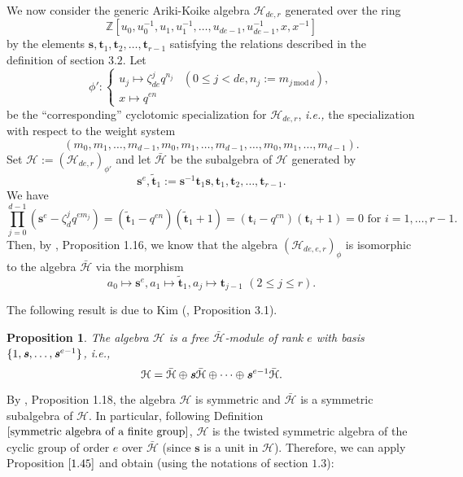 \documentclass[10pt,a4paper,titlepage]{article}
\newtheorem{proposition}[theorem]{Proposition}
\newcommand{\ie}{\emph{i.e., }}
\begin{document}
We now consider the generic Ariki-Koike algebra $\mathcal{H}_{de,r}$ generated over the ring
$$\mathbb{Z}[u_0,u_0^{-1},u_1,u_1^{-1},\ldots,u_{de-1},u_{de-1}^{-1},x,x^{-1}]$$
by the elements $\mathrm{\textbf{s}},\mathrm{\textbf{t}}_1,\mathrm{\textbf{t}}_2,\ldots,\mathrm{\textbf{t}}_{r-1}$ satisfying the relations described in the definition of section $3.2$. Let 
$$\phi' : \left\{ 
\begin{array}{ll} 
u_j \mapsto \zeta_{de}^{j} q^{n_j} &(0 \leq j <de, n_j := m_{j \,\mathrm{mod}\,d}), \\ 
x \mapsto q^{en}
\end{array} \right. 
$$
be the ``corresponding'' cyclotomic specialization for  $\mathcal{H}_{de,r}$, \ie the specialization with respect to the weight system $$(m_0,m_1,\ldots,m_{d-1},m_0,m_1,\ldots,m_{d-1},\ldots,m_0,m_1,\ldots,m_{d-1}).$$
Set $\mathcal{H}:=(\mathcal{H}_{de,r})_{\phi'}$ and let $\bar{\mathcal{H}}$ be the subalgebra of $\mathcal{H}$ generated by
$$\textbf{s}^e, \tilde{\textbf{t}}_1:=\textbf{s}^{-1}\textbf{t}_1\textbf{s}, 
\textbf{t}_1, \textbf{t}_2, \ldots, \textbf{t}_{r-1}.$$
We have
$$\prod_{j=0}^{d-1}(\textbf{s}^e-\zeta_d^jq^{em_j})=(\tilde{\textbf{t}}_1-q^{en})(\tilde{\textbf{t}}_1+1)=
(\textbf{t}_i-q^{en})(\textbf{t}_i+1)=0 \textrm{ for } i=1,\ldots, r-1.$$
Then, by \cite{Ariki}, Proposition 1.16, we know that the algebra $(\mathcal{H}_{de,e,r})_\phi$ is isomorphic to the algebra $\bar{\mathcal{H}}$ via the morphism
$$a_0 \mapsto  \textbf{s}^e, a_1 \mapsto \tilde{\textbf{t}}_1, a_j \mapsto \textbf{t}_{j-1}\,\, (2 \leq j \leq r).$$

The following result is due to Kim (\cite{Kim}, Proposition 3.1).

\begin{proposition}\label{KIm}
The algebra $\mathcal{H}$ is a free $\bar{\mathcal{H}}$-module of rank $e$ with basis $\{1,\textbf{\emph{s}},\ldots,\textbf{\emph{s}}^{e-1}\}$, i.e., $$\mathcal{H}=\bar{\mathcal{H}} \oplus \textbf{\emph{s}} \bar{\mathcal{H}} \oplus \cdots \oplus \textbf{\emph{s}}^{e-1}\bar{\mathcal{H}}.$$
\end{proposition} 

By \cite{BMM2}, Proposition 1.18, the algebra $\mathcal{H}$ is symmetric and $\bar{\mathcal{H}}$ is a symmetric subalgebra of $\mathcal{H}$. In particular, following Definition $\ref{symmetric algebra of a finite group}$, $\mathcal{H}$ is the twisted symmetric algebra of the cyclic group of order $e$ over $\bar{\mathcal{H}}$ (since $\textbf{s}$ is a unit in $\mathcal{H}$). Therefore, we can apply Proposition $\ref{1.45}$ and obtain (using the notations of section $1.3$):
\end{document}
